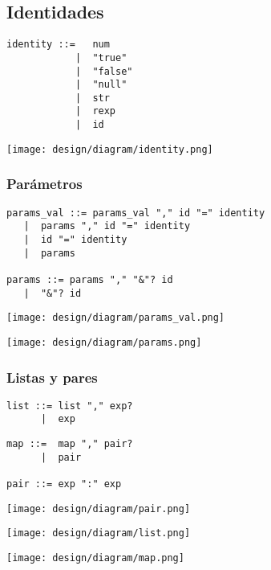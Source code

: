 \subsection{Identidades}
\begin{multicols}{2}
\begin{lstlisting}[style=nonumbers]      
identity ::=   num
            |  "true"
            |  "false"
            |  "null"
            |  str
            |  rexp
            |  id 
\end{lstlisting}  
\columnbreak	
\begin{center}
\texttt{[image: design/diagram/identity.png]} 
\end{center}
\end{multicols}
\subsubsection{Parámetros}
\begin{lstlisting}[style=nonumbers]
params_val ::= params_val "," id "=" identity 
   |  params "," id "=" identity 
   |  id "=" identity 
   |  params
   
params ::= params "," "&"? id
   |  "&"? id
\end{lstlisting}
\begin{multicols}{2}
\begin{center}
\texttt{[image: design/diagram/params\_val.png]} 
\end{center}
\columnbreak
\begin{center}
\texttt{[image: design/diagram/params.png]} 
\end{center}
\end{multicols}

\subsubsection {Listas y pares}
\begin{multicols}{2}
\begin{lstlisting}[style=nonumbers]      
list ::= list "," exp?
      |  exp
\end{lstlisting}  
\begin{lstlisting}[style=nonumbers]      
map ::=  map "," pair?
      |  pair
   
pair ::= exp ":" exp
\end{lstlisting}  
\begin{center}
\texttt{[image: design/diagram/pair.png]} 
\end{center}
\columnbreak	
\begin{center}
\texttt{[image: design/diagram/list.png]} 
\end{center}
\begin{center}
\texttt{[image: design/diagram/map.png]} 
\end{center}
\end{multicols}

